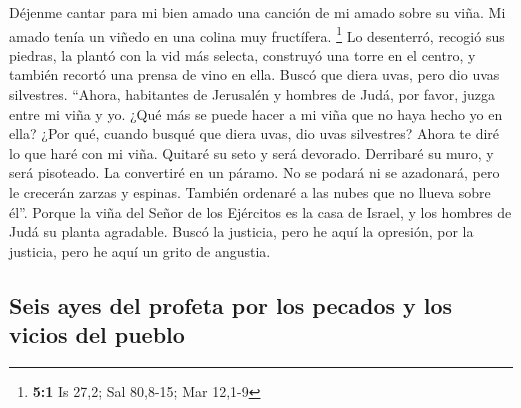  Déjenme cantar para mi bien amado una canción de mi amado
sobre su viña. Mi amado tenía un viñedo en una colina muy fructífera.
\footnote{\textbf{5:1} Is 27,2; Sal 80,8-15; Mar 12,1-9} 
Lo desenterró, recogió sus piedras, la plantó con la vid más selecta,
construyó una torre en el centro, y también recortó una prensa de vino
en ella. Buscó que diera uvas, pero dio uvas silvestres. 
``Ahora, habitantes de Jerusalén y hombres de Judá, por favor, juzga
entre mi viña y yo.  ¿Qué más se puede hacer a mi viña que
no haya hecho yo en ella? ¿Por qué, cuando busqué que diera uvas, dio
uvas silvestres?  Ahora te diré lo que haré con mi viña.
Quitaré su seto y será devorado. Derribaré su muro, y será pisoteado.
 La convertiré en un páramo. No se podará ni se azadonará,
pero le crecerán zarzas y espinas. También ordenaré a las nubes que no
llueva sobre él''.  Porque la viña del Señor de los
Ejércitos es la casa de Israel, y los hombres de Judá su planta
agradable. Buscó la justicia, pero he aquí la opresión, por la justicia,
pero he aquí un grito de angustia.

\hypertarget{seis-ayes-del-profeta-por-los-pecados-y-los-vicios-del-pueblo}{%
\subsection{Seis ayes del profeta por los pecados y los vicios del
pueblo}\label{seis-ayes-del-profeta-por-los-pecados-y-los-vicios-del-pueblo}}

